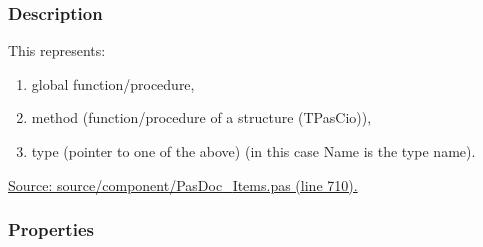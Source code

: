 \documentclass{report}
\begin{document}
\subsubsection*{\large{\textbf{Description}}\normalsize\hspace{1ex}\hfill}
This represents: \begin{enumerate}
\setcounter{enumi}{0} \setcounter{enumii}{0} \setcounter{enumiii}{0} \setcounter{enumiv}{0} 
\item global function/procedure,
\setcounter{enumi}{1} \setcounter{enumii}{1} \setcounter{enumiii}{1} \setcounter{enumiv}{1} 
\item method (function/procedure of a structure (TPasCio)),
\setcounter{enumi}{2} \setcounter{enumii}{2} \setcounter{enumiii}{2} \setcounter{enumiv}{2} 
\item type (pointer to one of the above) (in this case Name is the type name).
\end{enumerate}\par
\href{https://github.com/pasdoc/pasdoc/blob/master/source/component/PasDoc_Items.pas#L710}{Source: source/component/PasDoc{\_}Items.pas (line 710).}\subsubsection*{\large{\textbf{Properties}}\normalsize\hspace{1ex}\hfill}
\end{document}
